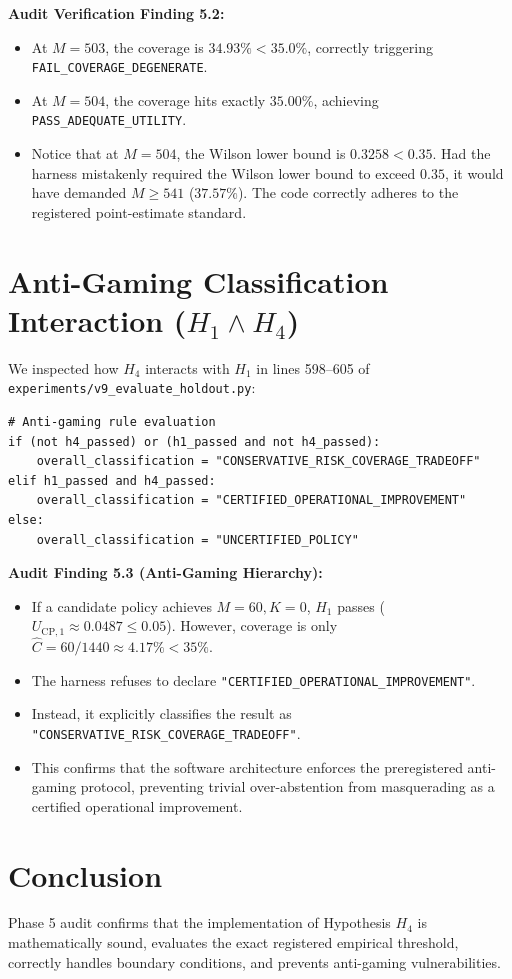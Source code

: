 \documentclass[10pt,a4paper]{article}
\begin{document}
\noindent \textbf{Audit Verification Finding 5.2:}
\begin{itemize}
    \item At $M = 503$, the coverage is $34.93\% < 35.0\%$, correctly triggering \texttt{FAIL\_COVERAGE\_DEGENERATE}.
    \item At $M = 504$, the coverage hits exactly $35.00\%$, achieving \texttt{PASS\_ADEQUATE\_UTILITY}.
    \item Notice that at $M = 504$, the Wilson lower bound is $0.3258 < 0.35$. Had the harness mistakenly required the Wilson lower bound to exceed $0.35$, it would have demanded $M \ge 541$ ($37.57\%$). The code correctly adheres to the registered point-estimate standard.
\end{itemize}

\section{Anti-Gaming Classification Interaction ($H_1 \land H_4$)}
We inspected how $H_4$ interacts with $H_1$ in lines 598--605 of \texttt{experiments/v9\_evaluate\_holdout.py}:
\begin{verbatim}
# Anti-gaming rule evaluation
if (not h4_passed) or (h1_passed and not h4_passed):
    overall_classification = "CONSERVATIVE_RISK_COVERAGE_TRADEOFF"
elif h1_passed and h4_passed:
    overall_classification = "CERTIFIED_OPERATIONAL_IMPROVEMENT"
else:
    overall_classification = "UNCERTIFIED_POLICY"
\end{verbatim}

\noindent \textbf{Audit Finding 5.3 (Anti-Gaming Hierarchy):}
\begin{itemize}
    \item If a candidate policy achieves $M = 60, K = 0$, $H_1$ passes ($U_{\mathrm{CP}, 1} \approx 0.0487 \le 0.05$). However, coverage is only $\hat{C} = 60 / 1440 \approx 4.17\% < 35\%$.
    \item The harness refuses to declare \texttt{"CERTIFIED\_OPERATIONAL\_IMPROVEMENT"}.
    \item Instead, it explicitly classifies the result as \texttt{"CONSERVATIVE\_RISK\_COVERAGE\_TRADEOFF"}.
    \item This confirms that the software architecture enforces the preregistered anti-gaming protocol, preventing trivial over-abstention from masquerading as a certified operational improvement.
\end{itemize}

\section{Conclusion}
Phase 5 audit confirms that the implementation of Hypothesis $H_4$ is mathematically sound, evaluates the exact registered empirical threshold, correctly handles boundary conditions, and prevents anti-gaming vulnerabilities.
\end{document}
